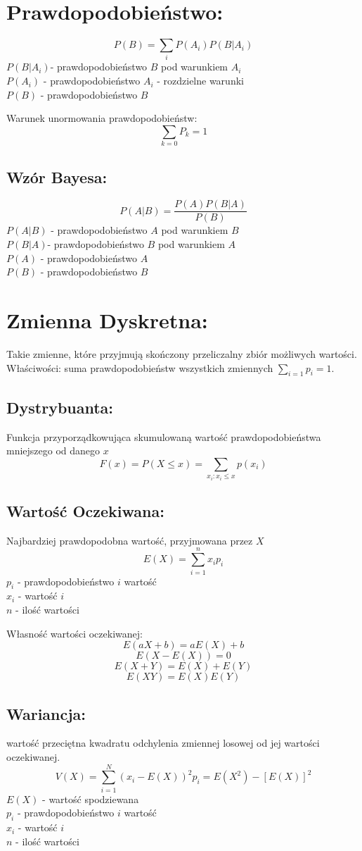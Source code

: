 \documentclass[fleqn,a4paper]{article}
\begin{document}
\pagebreak
\section{Prawdopodobieństwo:}
\[P(B) = \sum_i{P(A_i)P(B|A_i)}\]
$P(B|A_i)$- prawdopodobieństwo $B$ pod warunkiem $A_i$\\
$P(A_i)$ - prawdopodobieństwo $A_i$ - rozdzielne warunki\\
$P(B)$ - prawdopodobieństwo $B$

Warunek unormowania prawdopodobieństw:
\[\sum_{k=0}{P_k}=1\]

\subsection{Wzór Bayesa:}
\[P(A|B) = \frac{P(A)P(B|A)}{P(B)}\]
$P(A|B)$ - prawdopodobieństwo $A$ pod warunkiem $B$\\
$P(B|A)$- prawdopodobieństwo $B$ pod warunkiem $A$\\
$P(A)$ - prawdopodobieństwo $A$\\
$P(B)$ - prawdopodobieństwo $B$

\pagebreak

\section{Zmienna Dyskretna:}
Takie zmienne, które przyjmują skończony przeliczalny zbiór możliwych wartości.
Właściwości: suma prawdopodobieństw wszystkich zmiennych \(\sum_{i=1}{p_i}=1\).
\subsection{Dystrybuanta:}
Funkcja przyporządkowująca skumulowaną wartość prawdopodobieństwa mniejszego od danego $x$
\[F(x)=P(X \leq x)=\sum_{x_i:x_i \leq x}p(x_i)\]
\subsection{Wartość Oczekiwana:}
Najbardziej prawdopodobna wartość, przyjmowana przez $X$
\[E(X) = \sum_{i=1}^nx_ip_i\]
$p_i$ - prawdopodobieństwo $i$ wartość\\
$x_i$ - wartość $i$\\
$n$   - ilość wartości

Własność wartości oczekiwanej:
\[E(aX+b)=aE(X)+b\]
\[E(X-E(X))=0\]
\[E(X+Y)=E(X)+E(Y)\]
\[E(XY)=E(X)E(Y)\]

\subsection{Wariancja:}
wartość przeciętna kwadratu odchylenia zmiennej losowej od jej wartości oczekiwanej.
\[V(X) = \sum_{i=1}^N(x_i-E(X))^2p_i = E(X^2) - [E(X)]^2\]
$E(X)$ - wartość spodziewana\\
$p_i$ - prawdopodobieństwo $i$ wartość\\
$x_i$ - wartość $i$\\
$n$   - ilość wartości
\end{document}
